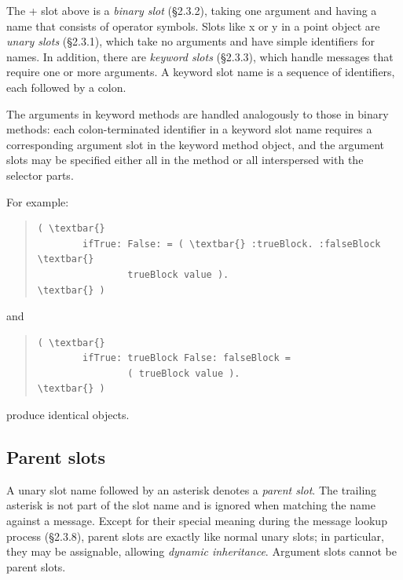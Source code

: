 \documentclass[letterpaper,10pt,english]{sphinxmanual}
\begin{document}
The + slot above is a \emph{binary slot} (\S{}2.3.2), taking one argument and having a name that consists of operator symbols. Slots like x or y in a point object are \emph{unary slots} (\S{}2.3.1), which take no arguments and have simple identifiers for names. In addition, there are \emph{keyword slots} (\S{}2.3.3), which handle messages that require one or more arguments. A keyword slot name is a sequence of identifiers, each followed by a colon.

The arguments in keyword methods are handled analogously to those in binary methods: each colon-terminated identifier in a keyword slot name requires a corresponding argument slot in the keyword method object, and the argument slots may be specified either all in the method or all interspersed with the selector parts.

For example:
\begin{quote}

\begin{Verbatim}[commandchars=\\\{\}]
( \textbar{}
        ifTrue: False: = ( \textbar{} :trueBlock. :falseBlock \textbar{}
                trueBlock value ).
\textbar{} )
\end{Verbatim}
\end{quote}

and
\begin{quote}

\begin{Verbatim}[commandchars=\\\{\}]
( \textbar{}
        ifTrue: trueBlock False: falseBlock =
                ( trueBlock value ).
\textbar{} )
\end{Verbatim}
\end{quote}

produce identical objects.


\subsection{Parent slots}
\label{langref:parent-slots}\label{langref:index-40}
A unary slot name followed by an asterisk denotes a \emph{parent slot}. The trailing asterisk is not part of the slot name and is ignored when matching the name against a message. Except for their special meaning during the message lookup process (\S{}2.3.8), parent slots are exactly like normal unary slots; in particular, they may be assignable, allowing \emph{dynamic inheritance}. Argument slots cannot be parent slots.
\end{document}

